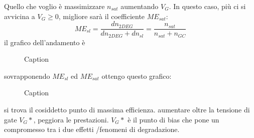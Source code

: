 Quello che voglio è massimizzare $n_{sat}$ aumentando $V_G$.
In questo caso, più ci si avvicina a $V_G \geq 0$, migliore sarà il coefficiente $ME_{sat}$:
\begin{equation}
    ME_{sl}=\dfrac{dn_{2DEG}}{dn_{2DEG}+dn_{sl}}=\dfrac{n_{sat}}{n_{sat}+n_{GC}}
\end{equation}
il grafico dell'andamento è
\begin{figure}[hbt!]
    \centering
    \caption{Caption}%
    \label{fig:enter-label}
\end{figure}

sovrapponendo $ME_{sl}$ ed $ME_{sat} $ ottengo questo grafico:
\begin{figure}[hbt!]
    \centering
    \caption{Caption}%
    \label{fig:enter-label}
\end{figure}
si trova il cosiddetto punto di massima efficienza. aumentare oltre la tensione di gate $V_G*$, peggiora le prestazioni. $V_G*$ è il punto di bias che pone un compromesso tra i due effetti /fenomeni di degradazione.


